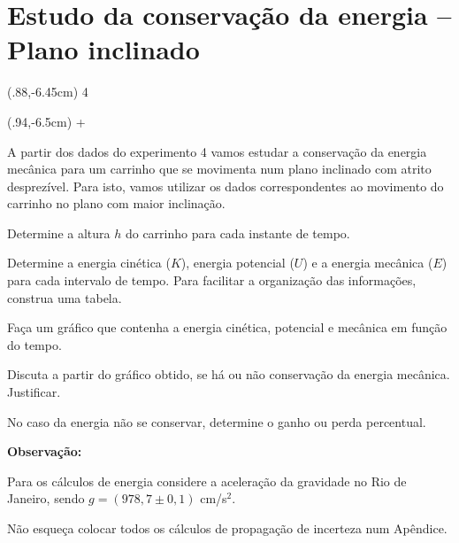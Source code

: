 \chapter*{Estudo da conservação da energia -- Plano inclinado}

{\fontsize{76}{80} \color{gray}
\begin{textblock*}{100mm}(.88\textwidth,-6.45cm)
4 \end{textblock*}
\begin{textblock*}{100mm}(.94\textwidth,-6.5cm)
+ \end{textblock*}

}


\vspace{-0.5cm}

A partir dos dados do experimento 4 vamos estudar a conservação da energia mecânica para um carrinho que se movimenta num plano inclinado com atrito desprezível. Para isto, vamos utilizar os dados correspondentes ao movimento do carrinho no plano com maior inclinação.

\begin{num}

\item Determine a altura $h$ do carrinho para cada instante de tempo.
\item Determine a energia cinética ($K$), energia potencial ($U$) e a energia mecânica ($E$) para cada intervalo de tempo. Para facilitar a organização das informações, construa uma tabela.
\item Faça um gráfico que contenha a energia cinética, potencial e mecânica em função do tempo.
\item Discuta a partir do gráfico obtido, se há ou não conservação da energia mecânica. Justificar.
\item No caso da energia não se conservar, determine o ganho ou perda percentual.
\end{num}

{\bf Observação:}
\vspace{-0.5cm}
\begin{iten}
\item Para os cálculos de energia considere a aceleração da gravidade no Rio de Janeiro, sendo $g = (978,7 \pm 0,1)$ cm/s$^2$.  
\item Não esqueça colocar todos os cálculos de propagação de incerteza num Apêndice. 
\end{iten}


